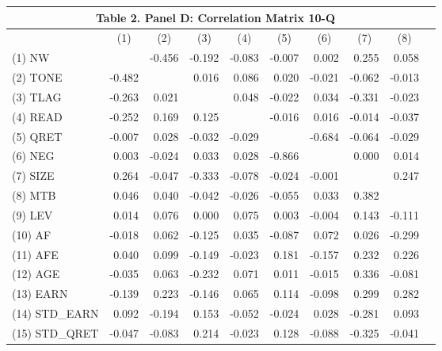 \begin{table}[H] \label{T2PD}
	\centering
	\begin{tabular}{lrrrrrrrrr}
		\multicolumn{9}{c}{\textbf{Table 2. Panel D: Correlation Matrix 10-Q}} \\
		\midrule
		\midrule
		& \multicolumn{1}{c}{(1)} & \multicolumn{1}{c}{(2)} & \multicolumn{1}{c}{(3)} & \multicolumn{1}{c}{(4)} & \multicolumn{1}{c}{(5)} & \multicolumn{1}{c}{(6)} & \multicolumn{1}{c}{(7)} & \multicolumn{1}{c}{(8)} \\
		\midrule
		(1) NW &  & -0.456 & -0.192 & -0.083 & -0.007 & 0.002 & 0.255 & 0.058 & \\
		(2) TONE & -0.482 &  & 0.016 & 0.086 & 0.020 & -0.021 & -0.062 & -0.013 &  \\
		(3) TLAG & -0.263 & 0.021 &  & 0.048 & -0.022 & 0.034 & -0.331 & -0.023 & \\
		(4) READ & -0.252 & 0.169 & 0.125 &  & -0.016 & 0.016 & -0.014 & -0.037 & \\
		(5) QRET & -0.007 & 0.028 & -0.032 & -0.029 &  & -0.684 & -0.064 & -0.029 & \\
		(6) NEG & 0.003 & -0.024 & 0.033 & 0.028 & -0.866 &  & 0.000 & 0.014 &  \\
		(7) SIZE & 0.264 & -0.047 & -0.333 & -0.078 & -0.024 & -0.001 &  & 0.247 & \\
		(8) MTB & 0.046 & 0.040 & -0.042 & -0.026 & -0.055 & 0.033 & 0.382 &  &  \\
		(9) LEV & 0.014 & 0.076 & 0.000 & 0.075 & 0.003 & -0.004 & 0.143 & -0.111 &  \\
		(10) AF & -0.018 & 0.062 & -0.125 & 0.035 & -0.087 & 0.072 & 0.026 & -0.299 &  \\
		(11) AFE & 0.040 & 0.099 & -0.149 & -0.023 & 0.181 & -0.157 & 0.232 & 0.226 &  \\
		(12) AGE & -0.035 & 0.063 & -0.232 & 0.071 & 0.011 & -0.015 & 0.336 & -0.081 &  \\
		(13) EARN & -0.139 & 0.223 & -0.146 & 0.065 & 0.114 & -0.098 & 0.299 & 0.282 &  \\
		(14) STD\_EARN & 0.092 & -0.194 & 0.153 & -0.052 & -0.024 & 0.028 & -0.281 & 0.093 &  \\
		(15) STD\_QRET & -0.047 & -0.083 & 0.214 & -0.023 & 0.128 & -0.088 & -0.325 & -0.041 & \\
		\bottomrule
		\bottomrule
	\end{tabular}%
\end{table}%